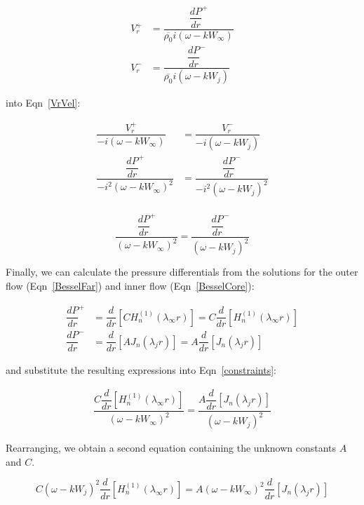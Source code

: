\documentclass[]{aiaa-tc}%
\begin{document}
\begin{align*}
V_r^+ &=\dfrac{\dfrac{dP}{dr}^+}{\overline{\rho_0} i( \omega - kW_{\infty})} \\
V_r^- &= \dfrac{\dfrac{dP}{dr}^-}{\overline{\rho_0} i( \omega - kW_{j})}
\end{align*}

\noindent into Eqn~\ref{VrVel}:

\begin{align*}
\dfrac{V_r^+}{-i(\omega - kW_{\infty})}
    &= \dfrac{V_r^-}{-i(\omega - kW_{j})} \\
\dfrac{\dfrac{dP}{dr}^+}{-i^2(\omega - kW_{\infty})^2}
    &= \dfrac{\dfrac{dP}{dr}^-}{-i^2(\omega - kW_{j})^2} \\
\end{align*}

\begin{equation} \label{constraints}
\boxed{\dfrac{\dfrac{dP}{dr}^+}{(\omega - kW_{\infty})^2}
    = \dfrac{\dfrac{dP}{dr}^-}{(\omega - kW_{j})^2}}
\end{equation}

Finally, we can calculate the pressure differentials from the solutions for the outer flow (Eqn~\ref{BesselFar}) and inner flow (Eqn~\ref{BesselCore}):

\begin{align*}
\dfrac{dP}{dr}^+ &= \dfrac{d}{dr} \left[C H_n^{(1)}(\lambda_{\infty} r) \right]
    = C \dfrac{d}{dr}\left[H_n^{(1)}(\lambda_{\infty} r)\right] \\
\dfrac{dP}{dr}^- &= \dfrac{d}{dr} \left[A J_n(\lambda_j r) \right]
    = A \dfrac{d}{dr}\left[ J_n(\lambda_j r) \right]
\end{align*}

\noindent and substitute the resulting expressions into Eqn~\ref{constraints}:

\begin{align*}
\dfrac{C \dfrac{d}{dr}\left[H_n^{(1)}(\lambda_{\infty} r)\right]}{(\omega - kW_{\infty})^2}
    = \dfrac{A \dfrac{d}{dr}\left[ J_n(\lambda_j r) \right]}{(\omega - kW_{j})^2}
\end{align*}

\noindent Rearranging, we obtain a second equation containing the unknown constants $A$ and $C$.

\begin{equation} \label{constantsEqn2}
\boxed{
C(\omega - kW_{j})^2 \dfrac{d}{dr}\left[H_n^{(1)}(\lambda_{\infty} r)\right]
    = A(\omega - kW_{\infty})^2 \dfrac{d}{dr}\left[ J_n(\lambda_j r) \right]}
\end{equation}
\end{document}
